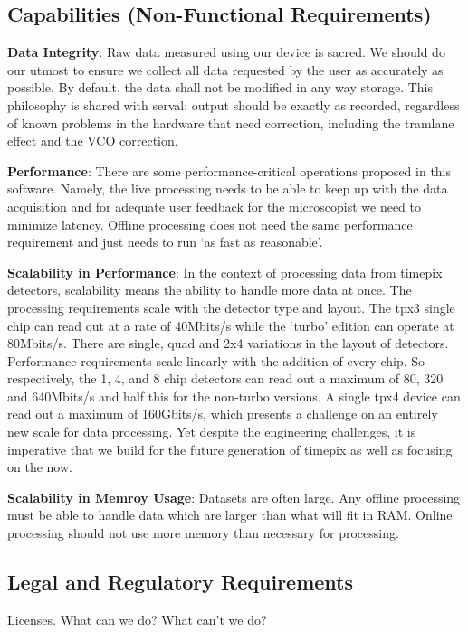 \documentclass[10pt]{article}
\begin{document}
    \subsection{Capabilities (Non-Functional Requirements)}

    \textbf{Data Integrity}: Raw data measured using our device is sacred. We should do our utmost to ensure we collect all data requested by the user as accurately as possible. By default, the data shall not be modified in any way storage. This philosophy is shared with serval; output should be exactly as recorded, regardless of known problems in the hardware that need correction, including the tramlane effect and the VCO correction.

    \textbf{Performance}: There are some performance-critical operations proposed in this software. Namely, the live processing needs to be able to keep up with the data acquisition and for adequate user feedback for the microscopist we need to minimize latency. Offline processing does not need the same performance requirement
    and just needs to run `as fast as reasonable'.

    \textbf{Scalability in Performance}: In the context of processing data from timepix detectors, scalability means the ability to handle more data at once. The processing requirements scale with the detector type and layout. The tpx3 single chip can read out at a rate of 40Mbits/s while the `turbo' edition can operate at 80Mbits/s. There are single, quad and 2x4 variations in the layout of detectors. Performance requirements scale linearly with the addition of every chip. So respectively, the 1, 4, and 8 chip detectors can read out a maximum of 80, 320 and 640Mbits/s and half this for the non-turbo versions. A single tpx4 device can read out a maximum of 160Gbits/s, which presents a challenge on an entirely new scale for data processing. Yet despite the engineering challenges, it is imperative that we build for the future generation of timepix as well as focusing on the now.

    \textbf{Scalability in Memroy Usage}: Datasets are often large. Any offline processing must be able to handle data which are larger than what will fit in RAM. Online processing should not use more memory than necessary for processing.


    \subsection{Legal and Regulatory Requirements}
    Licenses. What can we do? What can't we do?
\end{document}
